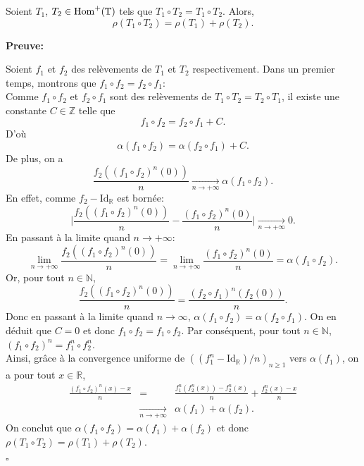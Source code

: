 \begin{theorem}\label{rho commute}
	Soient $T_1$, $T_2 \in \mathrm{Hom}^+({\mathbb{T}})$ tels que $T_1\circ T_2=T_1 \circ T_2$. Alors, $$\rho(T_1\circ T_2)=\rho(T_1)+\rho(T_2).$$
\end{theorem}

	\textbf{Preuve:}
	\par Soient $f_1$ et $f_2$ des relèvements de $T_1$ et $T_2$ respectivement. Dans un premier temps, montrons que $f_1 \circ f_2 = f_2 \circ f_1$:\\
	Comme $f_1 \circ f_2$ et $f_2 \circ f_1$ sont des relèvements de $T_1\circ T_2=T_2 \circ T_1$, il existe une constante $C \in \mathbb{Z}$ telle que
	$$f_1 \circ f_2 = f_2 \circ f_1 + C.$$
	D'où
	$$\alpha(f_1 \circ f_2) = \alpha(f_2 \circ f_1) + C.$$
	De plus, on a
	$$\frac{f_2((f_1\circ f_2)^n(0))}{n} \underset{n \to + \infty}{\longrightarrow} \alpha(f_1 \circ f_2).$$
	En effet, comme $f_2 - \mathrm{Id_{\mathbb{R}}}$ est bornée:
	$$\Big| \frac{f_2((f_1 \circ f_2)^n(0))}{n} - \frac{(f_1 \circ f_2)^n(0)}{n} \Big| \underset{n \to + \infty}{\longrightarrow}0.$$
	En passant à la limite quand $n \to + \infty$:
	$$\underset{n \to + \infty}{\lim} \frac{f_2((f_1 \circ f_2)^n(0))}{n} = \underset{n \to + \infty}{\lim} \frac{(f_1 \circ f_2)^n(0)}{n} = \alpha(f_1 \circ f_2).$$
	Or, pour tout $n \in \mathbb{N}$,
	$$ \frac{f_2((f_1 \circ f_2)^n(0))}{n} = \frac{(f_2 \circ f_1)^n(f_2(0))}{n}.$$
	Donc en passant à la limite quand $n \to \infty$, $\alpha(f_1 \circ f_2) = \alpha(f_2 \circ f_1)$. On en déduit que $C = 0$ et donc $f_1 \circ f_2 = f_1 \circ f_2$. Par conséquent, pour tout $n \in \mathbb{N}$, $(f_1 \circ f_2)^n = f_1^n \circ f_2^n$.\\
	Ainsi, grâce à la convergence uniforme de $((f_1^n - \mathrm{Id_{\mathbb{R}}})/n)_{n\geq 1}$ vers $\alpha(f_1)$, on a pour tout $x \in \mathbb{R}$,
	\begin{eqnarray*}
	\frac{(f_1 \circ f_2)^n(x) - x}{n} &=& \frac{f_1^n(f_2^n(x)) - f_2^n(x)}{n} + \frac{f_2^n(x)-x}{n}\\
	&\underset{n \to + \infty}{\longrightarrow}& \alpha(f_1) + \alpha(f_2) .
	\end{eqnarray*}
	On conclut que $\alpha(f_1 \circ f_2) = \alpha(f_1) + \alpha(f_2)$ et donc $\rho(T_1 \circ T_2)= \rho (T_1) + \rho(T_2)$.
	\begin{flushright}
		$\square$
	\end{flushright}











